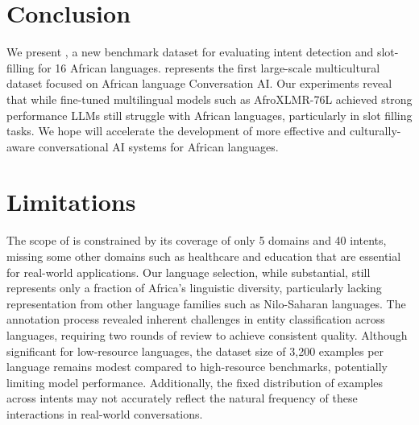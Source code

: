 \section{Conclusion}

We present \dataset{}, a new benchmark dataset for evaluating intent detection and slot-filling for 16 African languages. %
\dataset{} represents the first large-scale multicultural dataset focused on African language Conversation AI. Our experiments reveal that while fine-tuned multilingual models such as AfroXLMR-76L achieved strong performance LLMs still struggle with African languages, particularly in slot filling tasks. %
We hope \dataset{} will accelerate the development of more effective and culturally-aware conversational AI systems for African languages.

\section*{Limitations}
The scope of \dataset{} is constrained by its coverage of only 5 domains and 40 intents, missing some other domains such as healthcare and education that are essential for real-world applications. Our language selection, while substantial, still represents only a fraction of Africa's linguistic diversity, particularly lacking representation from other language families such as Nilo-Saharan languages.
The annotation process revealed inherent challenges in entity classification across languages, requiring two rounds of review to achieve consistent quality. %
Although significant for low-resource languages, the dataset size of 3,200 examples per language remains modest compared to high-resource benchmarks, potentially limiting model performance. Additionally, the fixed distribution of examples across intents may not accurately reflect the natural frequency of these interactions in real-world conversations.



